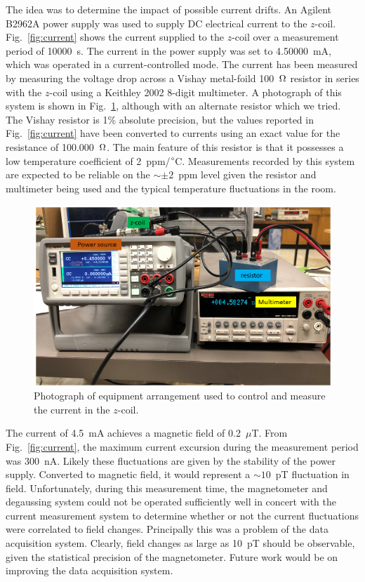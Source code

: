 The idea was to determine the impact of possible current drifts.  An
Agilent B2962A power supply was used to supply DC electrical current
to the $z$-coil.  Fig.~\ref{fig:current} shows the current supplied to
the $z$-coil over a measurement period of 10000~s.  The current in the
power supply was set to 4.50000~mA, which was operated in a
current-controlled mode.  The current has been measured by measuring
the voltage drop across a Vishay metal-foild 100~$\ohm$ resistor in
series with the $z$-coil using a Keithley 2002 8-digit multimeter.  A
photograph of this system is shown in
Fig.~\ref{fig:Current_study_setup}, although with an alternate
resistor which we tried.  The Vishay resistor is 1\% absolute
precision, but the values reported in Fig.~\ref{fig:current} have been
converted to currents using an exact value for the resistance of
100.000~$\ohm$.  The main feature of this resistor is that it
possesses a low temperature coefficient of 2~ppm/$\degree$C.
Measurements recorded by this system are expected to be reliable on
the $\sim\pm 2$~ppm level given the resistor and multimeter being used
and the typical temperature fluctuations in the room.


\begin{figure}%
\centering
\includegraphics[width=\linewidth]{figures/current_study_setup.png}
\caption{Photograph of equipment arrangement used to control and
  measure the current in the $z$-coil.\label{fig:Current_study_setup}}
\end{figure}

The current of 4.5~mA achieves a magnetic field of 0.2~$\mu$T.  From
Fig.~\ref{fig:current}, the maximum current excursion during the
measurement period was 300~nA.  Likely these fluctuations are given by
the stability of the power supply. Converted to magnetic field, it
would represent a $\sim 10$~pT fluctuation in field.  Unfortunately,
during this measurement time, the magnetometer and degaussing system
could not be operated sufficiently well in concert with the current
measurement system to determine whether or not the current
fluctuations were correlated to field changes.  Principally this was a
problem of the data acquisition system.  Clearly, field changes as
large as 10~pT should be observable, given the statistical precision
of the magnetometer.  Future work would be on improving the data
acquisition system.


